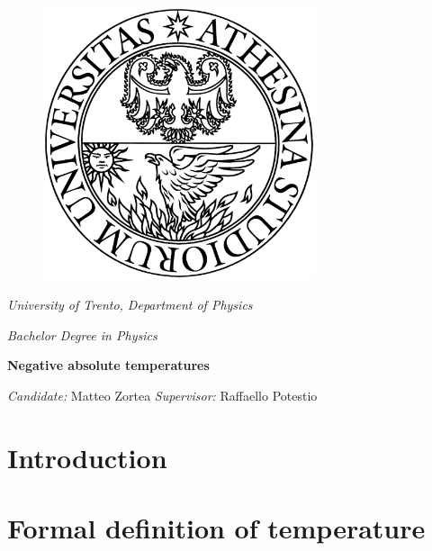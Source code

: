 \documentclass[]{article}
\begin{document}
\begin{titlepage}
    \vfill
    \begin{figure}[h]
        \centering
        \includegraphics[width=8cm]{./images/unitnlogo.png}
        \label{fig:logo}
    \end{figure}
    \vspace{5pt}
    \centerline{\itshape\huge University of Trento, Department of Physics}
    \vspace{10pt}
    \centerline{\emph{\huge Bachelor Degree in Physics}}
    \vspace{100pt}
    \centerline{\bfseries\Huge Negative absolute temperatures}
    \vspace{100pt}
    \centerline{\Large \hspace{100pt} \textit{Candidate:} Matteo Zortea
    \hspace{50pt} \textit{Supervisor:} Raffaello Potestio \hspace{100pt}}
    \vfill
\end{titlepage}

\hypersetup{linkcolor=black}
\tableofcontents
\newpage
\hypersetup{linkcolor=cyan}

\section*{Introduction}


\newpage

\section{Formal definition of temperature}
\label{sec:temperature}


\newpage
\end{document}
